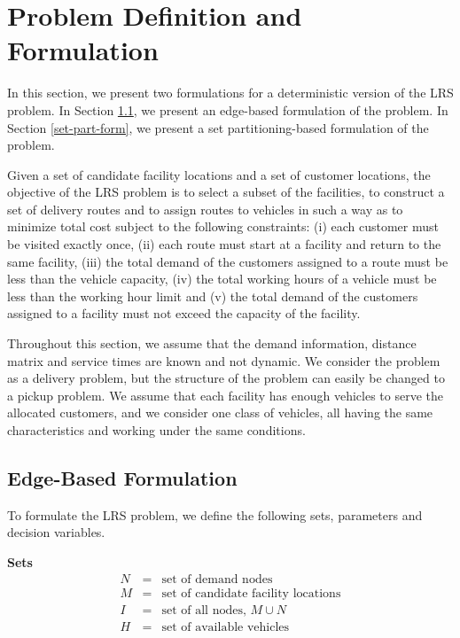 

\chapter {Problem Definition and Formulation}
\label{problem}
In this section, we present two formulations for a deterministic version 
of the LRS problem. In Section \ref{edge-based-form}, we present an edge-based 
formulation of the problem. In Section \ref{set-part-form}, we present a set 
partitioning-based formulation of the problem.

Given a set of candidate facility locations and a set of customer locations, 
the objective of the LRS problem is to select a subset of the facilities, 
to construct a set of delivery routes and to assign routes to vehicles 
in such a way as to minimize total cost subject to the following 
constraints: (i) each customer must be visited exactly once, (ii) each 
route must start at a facility and return to the same facility, (iii) the 
total demand of the customers assigned to a route must be less than the vehicle 
capacity, (iv) the total working hours of a vehicle must be less than the working 
hour limit and (v) the total demand of the customers assigned to a facility 
must not exceed the capacity of the facility.

Throughout this section, we assume that the demand information, distance matrix 
and service times are known and not dynamic. We consider the problem as a delivery 
problem, but the structure of the problem can easily be changed to a pickup problem. 
We assume that each facility has enough vehicles to serve the allocated customers, 
and we consider one class of vehicles, all having the same characteristics and 
working under the same conditions. 

\section{Edge-Based Formulation}
\label{edge-based-form}
To formulate the LRS problem, we define the following sets, parameters
and decision variables.

{\bf Sets}
\begin{eqnarray*}
N & = & \mbox{set of demand nodes} \\
M & = & \mbox{set of candidate facility locations} \\
I & = & \mbox{set of all nodes, $M \cup N$} \\
H & = & \mbox{set of available vehicles} 
\end{eqnarray*}

